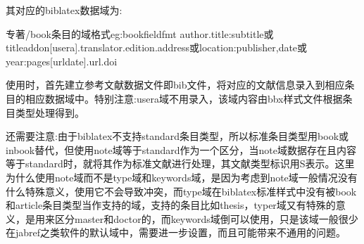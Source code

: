 \documentclass[11pt]{article} %
\begin{document}
其对应的biblatex数据域为:
\begin{codetex}{专著/book条目的域格式}{eg:bookfieldfmt}
author.title:subtitle或titleaddon[usera].translator.edition.address或location:publisher,date或year:pages[urldate].url.doi
\end{codetex}

使用时，首先建立参考文献数据文件即bib文件，将对应的文献信息录入到相应条目的相应数据域中。特别注意:usera域不用录入，该域内容由bbx样式文件根据条目类型处理得到。

还需要注意:由于biblatex不支持standard条目类型，所以标准条目类型用book或inbook替代，但使用note域等于standard作为一个区分，当note域数据存在且内容等于standard时，就将其作为标准文献进行处理，其文献类型标识用S表示。这里为什么使用note域而不是type域和keywords域，是因为考虑到note域一般情况没有什么特殊意义，使用它不会导致冲突，而type域在biblatex标准样式中没有被book和article条目类型当作支持的域，支持的条目比如thesis，typer域又有特殊的意义，是用来区分master和doctor的，而keywords域倒可以使用，只是该域一般很少在jabref之类软件的默认域中，需要进一步设置，而且可能带来不通用的问题。
\end{document}
